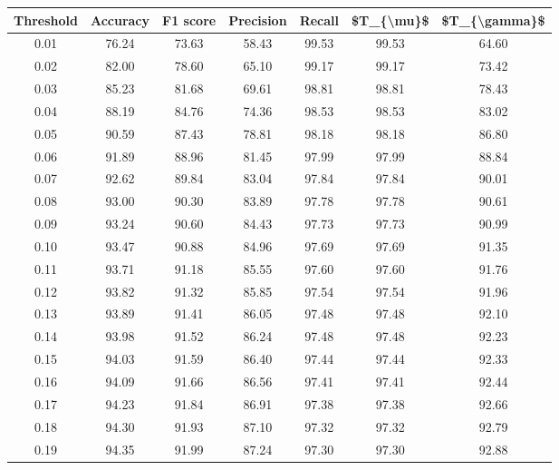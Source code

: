 \begin{tabular}{|c|c|c|c|c|c|c|}
\toprule
 Threshold &  Accuracy &  F1 score &  Precision &  Recall &  \$T\_\{\textbackslash mu\}\$ &  \$T\_\{\textbackslash gamma\}\$ \\
\hline
      0.01 &     76.24 &     73.63 &      58.43 &   99.53 &      99.53 &         64.60 \\
      0.02 &     82.00 &     78.60 &      65.10 &   99.17 &      99.17 &         73.42 \\
      0.03 &     85.23 &     81.68 &      69.61 &   98.81 &      98.81 &         78.43 \\
      0.04 &     88.19 &     84.76 &      74.36 &   98.53 &      98.53 &         83.02 \\
      0.05 &     90.59 &     87.43 &      78.81 &   98.18 &      98.18 &         86.80 \\
      0.06 &     91.89 &     88.96 &      81.45 &   97.99 &      97.99 &         88.84 \\
      0.07 &     92.62 &     89.84 &      83.04 &   97.84 &      97.84 &         90.01 \\
      0.08 &     93.00 &     90.30 &      83.89 &   97.78 &      97.78 &         90.61 \\
      0.09 &     93.24 &     90.60 &      84.43 &   97.73 &      97.73 &         90.99 \\
      0.10 &     93.47 &     90.88 &      84.96 &   97.69 &      97.69 &         91.35 \\
      0.11 &     93.71 &     91.18 &      85.55 &   97.60 &      97.60 &         91.76 \\
      0.12 &     93.82 &     91.32 &      85.85 &   97.54 &      97.54 &         91.96 \\
      0.13 &     93.89 &     91.41 &      86.05 &   97.48 &      97.48 &         92.10 \\
      0.14 &     93.98 &     91.52 &      86.24 &   97.48 &      97.48 &         92.23 \\
      0.15 &     94.03 &     91.59 &      86.40 &   97.44 &      97.44 &         92.33 \\
      0.16 &     94.09 &     91.66 &      86.56 &   97.41 &      97.41 &         92.44 \\
      0.17 &     94.23 &     91.84 &      86.91 &   97.38 &      97.38 &         92.66 \\
      0.18 &     94.30 &     91.93 &      87.10 &   97.32 &      97.32 &         92.79 \\
      0.19 &     94.35 &     91.99 &      87.24 &   97.30 &      97.30 &         92.88 \\

\end{tabular}
